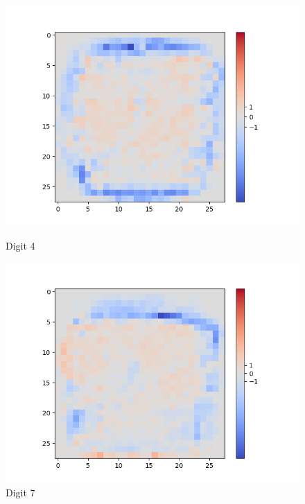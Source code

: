 \begin{figure}[H]
\begin{minipage}[b]{0.19\textwidth}
		\includegraphics[width=\textwidth]{Sigmoid(NO-Hidden)/Layer0-Neuron-4.png}
		\caption{Digit 4}
	\end{minipage}
	\begin{minipage}[b]{0.19\textwidth}
		\captionsetup{labelformat=empty}
		\includegraphics[width=\textwidth]{Sigmoid(NO-Hidden)/Layer0-Neuron-7.png}
		\caption{Digit 7}
	\end{minipage}
	\begin{minipage}[b]{0.19\textwidth}
		\captionsetup{labelformat=empty}

\end{minipage}
\end{figure}
